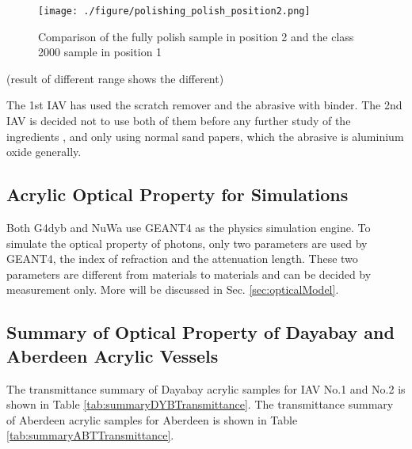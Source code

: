 \begin{figure}
    \centering
    \texttt{[image: ./figure/polishing\_polish\_position2.png]}
    \caption{Comparison of the fully polish sample in position 2 and the class 2000 sample in position 1}
    \label{polishing_polish_position2.png}
    \end{figure}


(result of different range shows the different)

The 1st IAV has used the scratch remover and the abrasive with binder. The 2nd
IAV is decided not to use both of them before any further study of the ingredients
, and only using normal sand papers, which the abrasive is aluminium oxide generally. 


\subsection {Acrylic Optical Property for Simulations}

Both G4dyb and NuWa use GEANT4 as the physics simulation engine.
To simulate the optical property of photons, only two parameters are used
by GEANT4, the index of refraction and the attenuation length. These two
parameters are different from materials to materials and can be decided
by measurement only.
More will be discussed in Sec. \ref{sec:opticalModel}.

\subsection {Summary of Optical Property of Dayabay and Aberdeen Acrylic Vessels}

The transmittance summary of Dayabay acrylic samples for IAV No.1 and No.2 is shown in Table \ref{tab:summaryDYBTransmittance}.
The transmittance summary of Aberdeen acrylic samples for Aberdeen is shown in Table \ref{tab:summaryABTTransmittance}.


